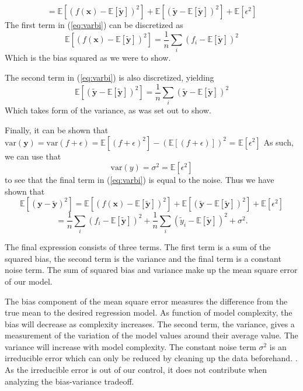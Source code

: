 \documentclass[11pt, a4paper]{article}
\begin{document}
\begin{equation}\label{eq:varbi}
  = \mathbb{E}\left[(f(\bm{x}) - \mathbb{E}\left[\bm{\tilde{y}}\right])^2\right] + \mathbb{E}\left[(\bm{\tilde{y}} - \mathbb{E}\left[\bm{\tilde{y}}\right])^2\right] + \mathbb{E}\left[\epsilon^2 \right]
\end{equation}
The first term in (\ref{eq:varbi}) can be discretized as
\[
  \mathbb{E}\left[(f(\bm{x}) - \mathbb{E}\left[\bm{\tilde{y}}\right])^2\right] = \frac{1}{n}\sum_i(f_i - \mathbb{E}\left[\bm{\tilde{y}}\right])^2
\]
Which is the bias squared as we were to show.

The second term in (\ref{eq:varbi}) is also discretized, yielding
\[
  \mathbb{E}\left[(\bm{\tilde{y}} - \mathbb{E}\left[\bm{\tilde{y}}\right])^2\right] = \frac{1}{n}\sum_i(\bm{\tilde{y}} - \mathbb{E}\left[\bm{\tilde{y}}\right])^2
\]
Which takes form of the variance, as was set out to show.

Finally, it can be shown that $\text{var}(\bm{y}) = \text{var}(f + \epsilon) = \mathbb{E}\left[(f + \epsilon)^2\right] - (\mathbb{E}\left[(f + \epsilon)\right])^2$ = $\mathbb{E}\left[\epsilon^2\right]$ As such, we can use that \[
  \text{var}(y) = \sigma^2 = \mathbb{E}\left[\epsilon^2\right]
\]
to see that the final term in (\ref{eq:varbi}) is equal to the noise. Thus we have shown that
\[
  \mathbb{E}\left[(\bm{y}-\bm{\tilde{y}})^2\right] = \mathbb{E}\left[(f(\bm{x}) - \mathbb{E}\left[\bm{\tilde{y}}\right])^2\right] + \mathbb{E}\left[(\bm{\tilde{y}} - \mathbb{E}\left[\bm{\tilde{y}}\right])^2\right] + \mathbb{E}\left[\epsilon^2 \right]
\]
\[
  =\frac{1}{n}\sum_i(f_i-\mathbb{E}\left[\bm{\tilde{y}}\right])^2+\frac{1}{n}\sum_i(\tilde{y}_i-\mathbb{E}\left[\bm{\tilde{y}}\right])^2+\sigma^2.
\]

The final expression consists of three terms. The first term is a sum of the squared bias, the second term is the variance and the final term is a constant noise term. The sum of squared bias and variance make up the mean square error of our model. \cite{Hastie2009}

The bias component of the mean square error measures the difference from the true mean to the desired regression model. As function of model complexity, the bias will decrease as complexity increases. The second term, the variance, gives a measurement of the variation of the model values around their average value. The variance will increase with model complexity. The constant noise term $\sigma^2$ is an irreducible error which can only be reduced by cleaning up the data beforehand. \cite{Geron2019}. As the irreducible error is out of our control, it does not contribute when analyzing the bias-variance tradeoff.
\end{document}
